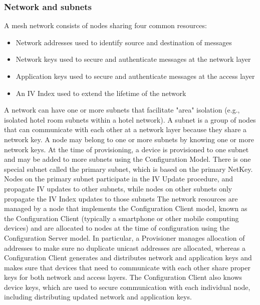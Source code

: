 \documentclass[\main/main.tex]{subfiles}
\begin{document}
\subsubsection{Network and subnets}
A mesh network consists of nodes sharing four common resources:
\begin{itemize}
    \item Network addresses used to identify source and destination of messages
    \item Network keys used to secure and authenticate messages at the network layer
    \item Application keys used to secure and authenticate messages at the access layer
    \item An IV Index used to extend the lifetime of the network
\end{itemize}

A network can have one or more subnets that facilitate "area" isolation (e.g., isolated hotel room subnets within a hotel network). A subnet is a group of nodes that can communicate with each other at a network layer because they share a network key. A node may belong to one or more subnets by knowing one or more network keys. At the time of provisioning, a device is provisioned to one subnet and may be added to more subnets using the Configuration Model.
\newline\newline
There is one special subnet called the primary subnet, which is based on the primary NetKey. Nodes on the primary subnet participate in the IV Update procedure, and propagate IV updates to other subnets, while nodes on other subnets only propagate the IV Index updates to those subnets
\newline\newline
The network resources are managed by a node that implements the Configuration Client model, known as the Configuration Client (typically a smartphone or other mobile computing devices) and are allocated to nodes at the time of configuration using the Configuration Server model. In particular, a Provisioner manages allocation of addresses to make sure no duplicate unicast addresses are allocated, whereas a Configuration Client generates and distributes network and application keys and makes sure that devices that need to communicate with each other share proper keys for both network and access layers. The Configuration Client also knows device keys, which are used to secure communication with each individual node, including distributing updated network and application keys.
\end{document}

